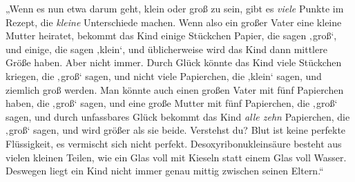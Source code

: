 „Wenn es nun etwa darum geht, klein oder groß zu sein, gibt es \emph{viele} Punkte im Rezept, die \emph{kleine} Unterschiede machen. Wenn also ein großer Vater eine kleine Mutter heiratet, bekommt das Kind einige Stückchen Papier, die sagen ‚groß‘, und einige, die sagen ‚klein‘, und üblicherweise wird das Kind dann mittlere Größe haben. Aber nicht immer. Durch Glück könnte das Kind viele Stückchen kriegen, die ‚groß‘ sagen, und nicht viele Papierchen, die ‚klein‘ sagen, und ziemlich groß werden. Man könnte auch einen großen Vater mit fünf Papierchen haben, die ‚groß‘ sagen, und eine große Mutter mit fünf Papierchen, die ‚groß‘ sagen, und durch unfassbares Glück bekommt das Kind \emph{alle zehn} Papierchen, die ‚groß‘ sagen, und wird größer als sie beide. Verstehst du? Blut ist keine perfekte Flüssigkeit, es vermischt sich nicht perfekt. Desoxyribonukleinsäure besteht aus vielen kleinen Teilen, wie ein Glas voll mit Kieseln statt einem Glas voll Wasser. Deswegen liegt ein Kind nicht immer genau mittig zwischen seinen Eltern.“

